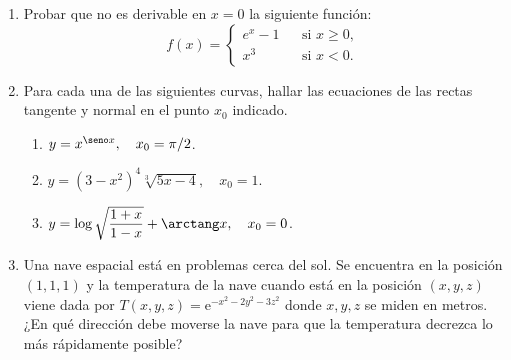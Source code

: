 \begin{enumerate}[leftmargin=*]

\item  Probar que no es derivable en $x=0$ la siguiente función:
\[ f(x)=\left\{
\begin{array}{ccl}
    e^x-1 &  & \mbox{si } x\geq 0,  \\
    x^3 &  & \mbox{si } x<0.
\end{array}\right.
\]

\item  Para cada una de las siguientes curvas, hallar las ecuaciones
de las rectas tangente y normal en el punto $x_{0}$ indicado.
\begin{enumerate}
    \item  $y=x^{\seno x},\quad x_{0}=\pi/2$.

    \item  $y=(3-x^2)^4\sqrt[3]{5x-4},\quad x_{0}=1$.

    \item  $y=\log \sqrt{\dfrac{1+x}{1-x}}+\arctang x, \quad x_{0}=0$.
\end{enumerate}

\item Una nave espacial está en problemas cerca del sol. Se
encuentra en la posición $(1,1,1)$ y la temperatura de la nave cuando
está en la posición $(x,y,z)$ viene dada por
$T(x,y,z)=\mbox{e}^{-x^2-2y^2-3z^2}$ donde $x,y,z$ se miden en metros.
¿En qué dirección debe moverse la nave para que la temperatura decrezca
lo más rápidamente posible?
\end{enumerate}